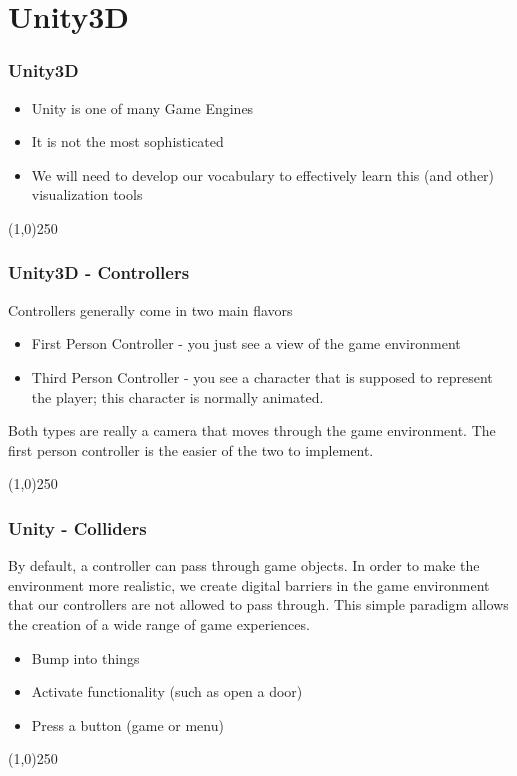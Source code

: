 \section{Unity3D}



\begin{frame}
\frametitle{Unity3D}
\begin{itemize}
	\item Unity is one of many Game Engines
	\item It is not the most sophisticated
	\item We will need to develop our vocabulary to effectively learn this (and other) visualization tools
\end{itemize}
\end{frame}
\begin{center}\line(1,0){250}\end{center}




\begin{frame}
\frametitle{Unity3D - Controllers}
Controllers generally come in two main flavors
\begin{itemize}
	\item First Person Controller - you just see a view of the game environment
	\item Third Person Controller - you see a character that is supposed to represent the player; this character is normally animated.
\end{itemize}
Both types are really a camera that moves through the game environment.  The first person controller is the easier of the two to implement.
\end{frame}
\begin{center}\line(1,0){250}\end{center}






\begin{frame}
\frametitle{Unity - Colliders}
By default, a controller can pass through game objects.  In order to make the environment more realistic, we create digital barriers in the game environment that our controllers are not allowed to pass through.  This simple paradigm allows the creation of a wide range of game experiences.
\begin{itemize}
	\item Bump into things
	\item Activate functionality (such as open a door)
	\item Press a button (game or menu)
\end{itemize}
\end{frame}
\begin{center}\line(1,0){250}\end{center}



